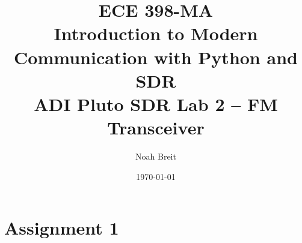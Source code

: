\documentclass[
	letterpaper, %
	10pt, %
]{CSUniSchoolLabReport}
\title{ECE 398-MA \\ Introduction to Modern Communication with Python and SDR \\ ADI Pluto SDR Lab 2 -- FM Transceiver} %
\author{Noah Breit} %
\date{\today} %
\begin{document}
\maketitle %




\section{Assignment 1}
\end{document}
